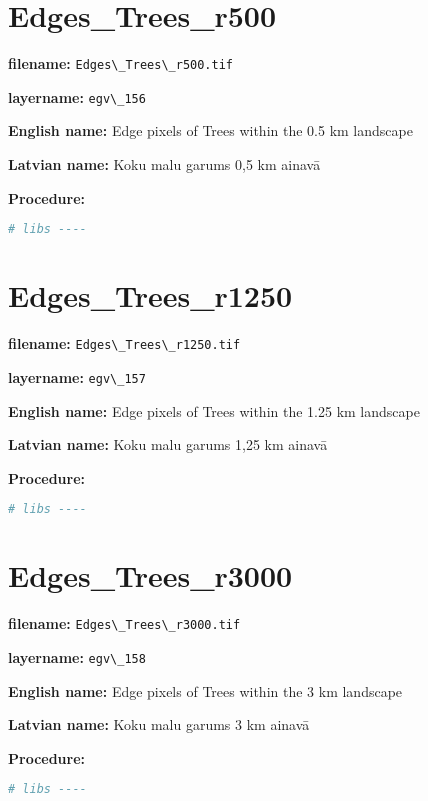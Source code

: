 \documentclass[
]{book}
\newcommand{\passthrough}[1]{#1}
\begin{document}
\section{Edges\_Trees\_r500}\label{ch06.156}

\textbf{filename:} \passthrough{\lstinline!Edges\_Trees\_r500.tif!}

\textbf{layername:} \passthrough{\lstinline!egv\_156!}

\textbf{English name:} Edge pixels of Trees within the 0.5 km landscape

\textbf{Latvian name:} Koku malu garums 0,5 km ainavā

\textbf{Procedure:}

\begin{lstlisting}[language=R]
# libs ----
\end{lstlisting}

\section{Edges\_Trees\_r1250}\label{ch06.157}

\textbf{filename:} \passthrough{\lstinline!Edges\_Trees\_r1250.tif!}

\textbf{layername:} \passthrough{\lstinline!egv\_157!}

\textbf{English name:} Edge pixels of Trees within the 1.25 km landscape

\textbf{Latvian name:} Koku malu garums 1,25 km ainavā

\textbf{Procedure:}

\begin{lstlisting}[language=R]
# libs ----
\end{lstlisting}

\section{Edges\_Trees\_r3000}\label{ch06.158}

\textbf{filename:} \passthrough{\lstinline!Edges\_Trees\_r3000.tif!}

\textbf{layername:} \passthrough{\lstinline!egv\_158!}

\textbf{English name:} Edge pixels of Trees within the 3 km landscape

\textbf{Latvian name:} Koku malu garums 3 km ainavā

\textbf{Procedure:}

\begin{lstlisting}[language=R]
# libs ----
\end{lstlisting}
\end{document}
